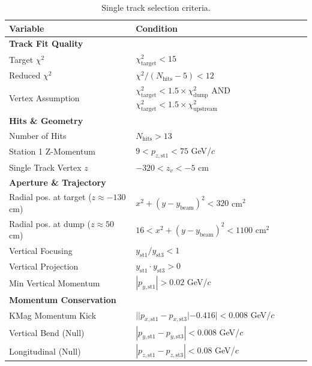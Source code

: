 \documentclass[11pt]{article}
\begin{document}
\begin{table}[h!]
    \centering
    \caption{Single track selection criteria.}
    \label{tab:single_track_cuts}
    \begin{tabular}{@{}ll@{}}
        \toprule
        \textbf{Variable} & \textbf{Condition} \\ 
        \midrule
        \textbf{Track Fit Quality} & \\
        Target $\chi^2$ & $\chi^2_{\text{target}} < 15$ \\
        Reduced $\chi^2$ & $\chi^2 / (N_{\text{hits}} - 5) < 12$ \\
        Vertex Assumption & $\chi^2_{\text{target}} < 1.5 \times \chi^2_{\text{dump}}$ AND $\chi^2_{\text{target}} < 1.5 \times \chi^2_{\text{upstream}}$ \\
        \midrule
        \textbf{Hits \& Geometry} & \\
        Number of Hits & $N_{\text{hits}} > 13$ \\
        Station 1 Z-Momentum & $9 < p_{z, \text{st1}} < 75$ GeV/$c$ \\
        Single Track Vertex $z$ & $-320 < z_{v} < -5$ cm \\
        \midrule
        \textbf{Aperture \& Trajectory} & \\
        Radial pos. at target ($z \approx -130$ cm) & $x^2 + (y-y_{\text{beam}})^2 < 320$ cm$^2$ \\
        Radial pos. at dump ($z \approx 50$ cm) & $16 < x^2 + (y-y_{\text{beam}})^2 < 1100$ cm$^2$ \\
        Vertical Focusing & $y_{\text{st1}} / y_{\text{st3}} < 1$ \\
        Vertical Projection & $y_{\text{st1}} \cdot y_{\text{st3}} > 0$ \\
        Min Vertical Momentum & $|p_{y, \text{st1}}| > 0.02$ GeV/$c$ \\
        \midrule
        \textbf{Momentum Conservation} & \\
        KMag Momentum Kick & $||p_{x, \text{st1}} - p_{x, \text{st3}}| - 0.416| < 0.008$ GeV/$c$ \\
        Vertical Bend (Null) & $|p_{y, \text{st1}} - p_{y, \text{st3}}| < 0.008$ GeV/$c$ \\
        Longitudinal (Null) & $|p_{z, \text{st1}} - p_{z, \text{st3}}| < 0.08$ GeV/$c$ \\
        \bottomrule
    \end{tabular}
\end{table}
\end{document}
